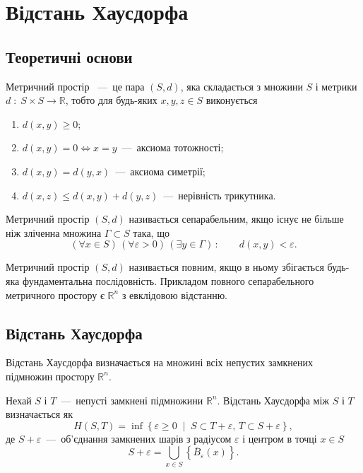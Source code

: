\chapter{Відстань Хаусдорфа}
\section{Теоретичні основи}
Метричний простір \cite{DorogovtsevMA}~---~це пара $ \left( S, d \right) $,
яка складається з множини $S$ і метрики
$d \; : \; S \times S \rightarrow \mathbb{R}$,
тобто для будь-яких $x, y, z \in S$ виконується
\begin{enumerate}
  \item $d \left( x, y \right) \geq 0$;
  \item $d \left( x, y \right) = 0 \Longleftrightarrow x = y$~---~аксиома тотожності;
  \item $d \left( x, y \right) = d \left( y, x \right) $~---~аксиома симетрії;
  \item $d \left( x, z \right) \leq
    d \left( x, y \right) + d \left( y, z \right) $~---~нерівність трикутника.
\end{enumerate}

Метричний простір $ \left( S, d \right) $ називається сепарабельним,
якщо існує не більше ніж зліченна множина $ \Gamma \subset S$ така, що
\begin{equation*}
  \left( \forall x \in S \right) \,
  \left( \forall \varepsilon > 0 \right) \,
  \left( \exists y \in \Gamma \right) \, : \qquad
  d \left( x, y \right) < \varepsilon.
\end{equation*}

Метричний простір $ \left( S, d \right) $ називається повним,
якщо в ньому збігається будь-яка фундаментальна послідовність.
Прикладом повного сепарабельного метричного простору є $ \mathbb{R}^n$
з евклідовою відстанню.

\section{Відстань Хаусдорфа}

Відстань Хаусдорфа визначається на
множині всіх непустих замкнених підмножин простору $ \mathbb{R}^n$.

Нехай $S$ і $T$~---~непусті замкнені підмножини $ \mathbb{R}^n$.
Відстань Хаусдорфа між $S$ і $T$ визначається як
\begin{equation}\label{eq:hausdorff:distance}
  H \left( S, T \right) =
  \inf \left\{
    \varepsilon \geq 0 \; \middle| \;
    S \subset T + \varepsilon, \, T \subset S + \varepsilon
  \right\},
\end{equation}
де $S + \varepsilon $~---~об'єднання замкнених шарів
з радіусом $ \varepsilon $ і центром в точці $x \in S$
\begin{equation*}\label{eq:set:expansion}
  S + \varepsilon =
  \bigcup \limits_{x \in S}
    \left\{ \overline{B}_{ \varepsilon } \left( x \right) \right\}.
\end{equation*}

